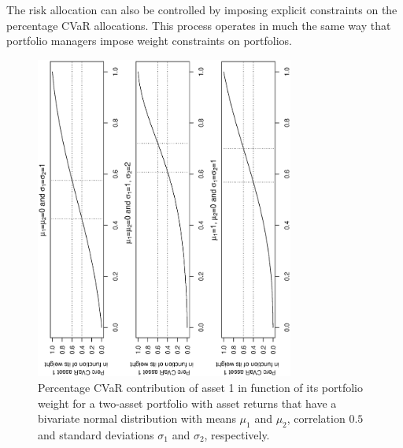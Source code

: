 \documentclass[12pt,a4paper]{article}
\begin{document}
The risk allocation can also be controlled by imposing explicit constraints on the percentage CVaR allocations.  This process operates in much the same way that portfolio managers impose weight constraints on portfolios.


\begin{figure}[tb] \label{fig:sensitivityfixedrho}
\begin{center}
\caption{Percentage CVaR contribution of asset 1 in function of its portfolio weight for a two-asset portfolio with asset returns that have a bivariate normal distribution with means $\mu_1$ and $\mu_2$, correlation $0.5$ and standard deviations $\sigma_1$ and $\sigma_2$, respectively.   }
\includegraphics[width=8.5cm,angle=270]{sensitivity_rho50.eps}
\end{center}
\end{figure}
\end{document}
